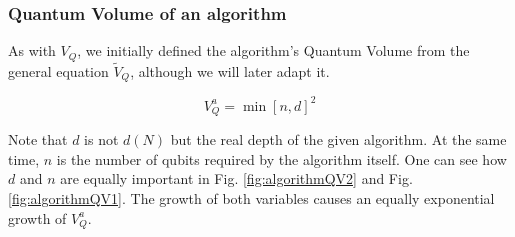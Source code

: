 \documentclass[11pt]{article}
\begin{document}
\subsubsection{Quantum Volume of an algorithm}
\label{sec:org65b96bf}

As with \(V_Q\), we initially defined the algorithm's Quantum Volume from the general equation \(\tilde{V}_Q\), although we will later adapt it.

$$V_Q^a = \min \left[ n,d \right]^2$$

Note that \(d\) is not \(d(N)\) but the real depth of the given algorithm.
At the same time, \(n\) is the number of qubits required by the algorithm itself.
One can see how \(d\) and \(n\) are equally important in Fig. \ref{fig:algorithmQV2} and Fig. \ref{fig:algorithmQV1}.
The growth of both variables causes an equally exponential growth of \(V^a_Q\).

\end{document}
